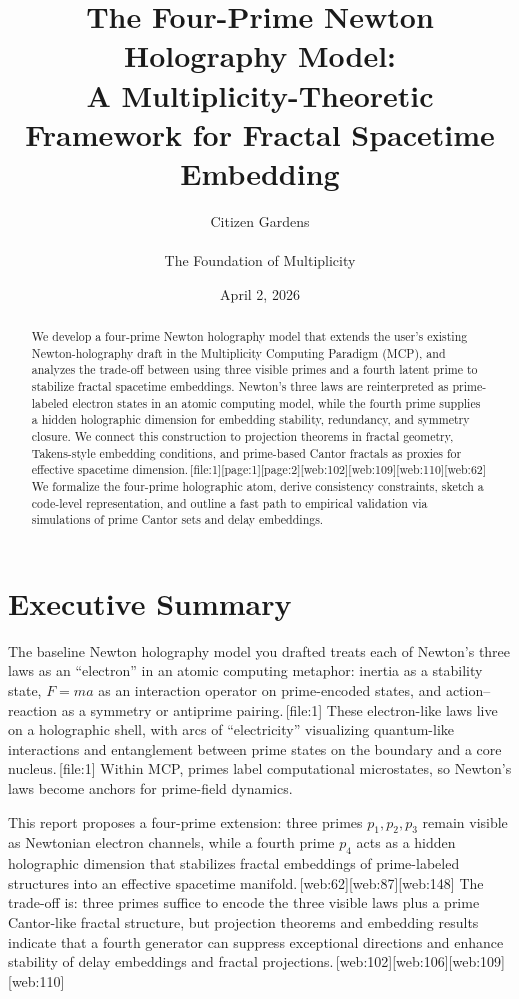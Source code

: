 \documentclass[11pt]{article}
\title{The Four-Prime Newton Holography Model:\\
A Multiplicity-Theoretic Framework for Fractal Spacetime Embedding}
\author{Citizen Gardens \\ \\ The Foundation of Multiplicity}
\date{April 2, 2026}
\begin{document}
\maketitle

\begin{abstract}
We develop a four-prime Newton holography model that extends the user's
existing Newton-holography draft in the Multiplicity Computing Paradigm (MCP),
and analyzes the trade-off between using three visible primes and a
fourth latent prime to stabilize fractal spacetime embeddings.
Newton's three laws are reinterpreted as prime-labeled electron states in an
atomic computing model, while the fourth prime supplies a hidden holographic
dimension for embedding stability, redundancy, and symmetry closure.
We connect this construction to projection theorems in fractal geometry,
Takens-style embedding conditions, and prime-based Cantor fractals as
proxies for effective spacetime dimension.\,[file:1][page:1][page:2][web:102][web:109][web:110][web:62]
We formalize the four-prime holographic atom, derive consistency
constraints, sketch a code-level representation, and outline a fast path
to empirical validation via simulations of prime Cantor sets and delay
embeddings.
\end{abstract}

\newpage
\section*{Executive Summary}

The baseline Newton holography model you drafted treats each of Newton's three
laws as an ``electron'' in an atomic computing metaphor: inertia as a
stability state, $F=ma$ as an interaction operator on prime-encoded states,
and action--reaction as a symmetry or antiprime pairing.\,[file:1]
These electron-like laws live on a holographic shell, with arcs of
``electricity'' visualizing quantum-like interactions and entanglement
between prime states on the boundary and a core nucleus.\,[file:1]
Within MCP, primes label computational microstates, so Newton's laws become
anchors for prime-field dynamics.

This report proposes a four-prime extension:
three primes $p_1,p_2,p_3$ remain visible as Newtonian electron channels,
while a fourth prime $p_4$ acts as a hidden holographic dimension that
stabilizes fractal embeddings of prime-labeled structures into an
effective spacetime manifold.\,[web:62][web:87][web:148]
The trade-off is:
three primes suffice to encode the three visible laws plus a prime
Cantor-like fractal structure, but projection theorems and embedding
results indicate that a fourth generator can suppress exceptional
directions and enhance stability of delay embeddings and fractal
projections.\,[web:102][web:106][web:109][web:110]
\end{document}
